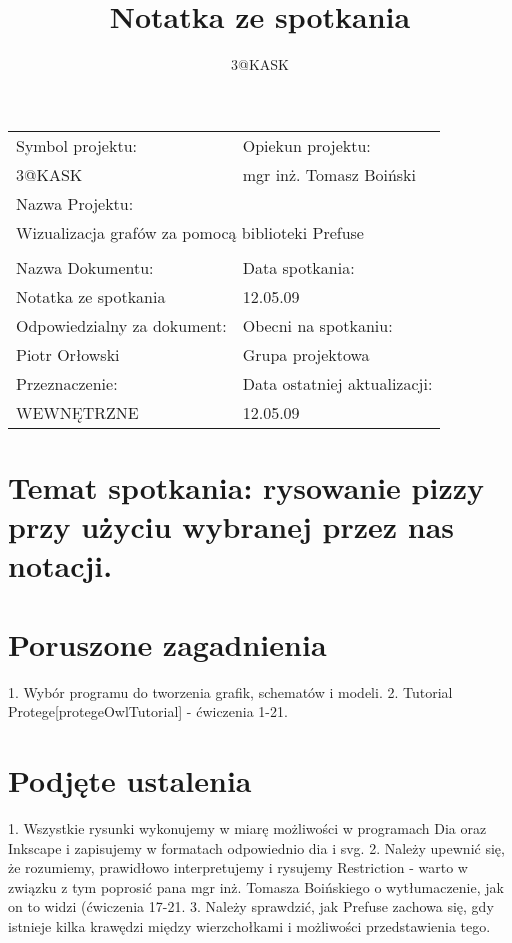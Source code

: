 \documentclass[a4paper,10pt]{article}
\title{Notatka ze spotkania}
\author{3@KASK}
\begin{document}



\maketitle


\begin{center}
\begin{tabular}{|p{7cm}|p{7cm}|}
\hline
Symbol projektu: & Opiekun projektu:   \tabularnewline 
3@KASK & mgr inż. Tomasz Boiński    \tabularnewline \hline
\multicolumn{2}{|l|}{Nazwa Projektu: } \tabularnewline
\multicolumn{2}{|l|}{Wizualizacja grafów za pomocą biblioteki Prefuse } \tabularnewline 
\hline
\multicolumn{2}{l}{ } \tabularnewline %
\hline 
Nazwa Dokumentu: & Data spotkania:   \tabularnewline 
Notatka ze spotkania & 12.05.09 \tabularnewline \hline
Odpowiedzialny za dokument: & Obecni na spotkaniu:   \tabularnewline 
Piotr Orłowski & Grupa projektowa \tabularnewline \hline
Przeznaczenie: & Data ostatniej aktualizacji:   \tabularnewline 
WEWNĘTRZNE & 12.05.09 \tabularnewline \hline
\end{tabular}
\end{center}



\section{Temat spotkania: rysowanie pizzy przy użyciu wybranej przez nas notacji.}


\section{Poruszone zagadnienia}
1. Wybór programu do tworzenia grafik, schematów i modeli.
2. Tutorial Protege[protegeOwlTutorial] - ćwiczenia 1-21.

\section{Podjęte ustalenia}
1. Wszystkie rysunki wykonujemy w miarę możliwości w programach Dia oraz Inkscape i zapisujemy w formatach odpowiednio dia i svg.
2. Należy upewnić się, że rozumiemy, prawidłowo interpretujemy i rysujemy Restriction - warto w związku z tym poprosić pana mgr inż. Tomasza Boińskiego o wytłumaczenie, jak on to widzi (ćwiczenia 17-21.
3. Należy sprawdzić, jak Prefuse zachowa się, gdy istnieje kilka krawędzi między wierzchołkami i możliwości przedstawienia tego.
\newpage
\tableofcontents
\newpage


\clearpage
{}
{}

\end{document}
